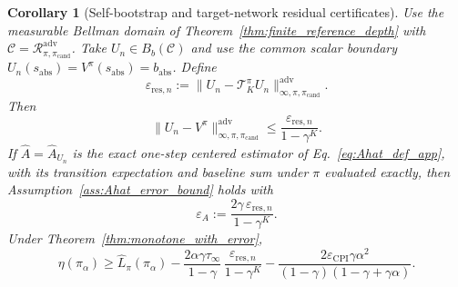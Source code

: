 \documentclass{article}
\theoremstyle{plain}
\newtheorem{corollary}[theorem]{Corollary}
\theoremstyle{definition}
\theoremstyle{remark}
\begin{document}
\begin{corollary}[Self-bootstrap and target-network residual certificates]
\label{cor:finite_depth_residual_certificate}
Use the measurable Bellman domain of Theorem~\ref{thm:finite_reference_depth}
with $\mathcal C=\mathcal R_{\pi,\pi_{\mathrm{cand}}}^{\mathrm{adv}}$.
Take $U_n\in B_b(\mathcal C)$ and use the common scalar boundary
$U_n(s_{\mathrm{abs}})=V^\pi(s_{\mathrm{abs}})=b_{\mathrm{abs}}$. Define
\begin{equation}
\varepsilon_{\mathrm{res},n}
:=
\|U_n-\mathcal{T}^\pi_K U_n\|_{\infty,\pi,\pi_{\mathrm{cand}}}^{\mathrm{adv}}.
\label{eq:eps_res_n_def}
\end{equation}
Then
\begin{equation}
\|U_n-V^\pi\|_{\infty,\pi,\pi_{\mathrm{cand}}}^{\mathrm{adv}}
\le
\frac{\varepsilon_{\mathrm{res},n}}{1-\gamma^K}.
\label{eq:finite_depth_residual_certificate}
\end{equation}
If $\widehat A=\widehat A_{U_n}$ is the exact one-step centered estimator of
Eq.~\eqref{eq:Ahat_def_app}, with its transition expectation and baseline sum
under $\pi$ evaluated exactly, then Assumption~\ref{ass:Ahat_error_bound}
holds with
\begin{equation}
\varepsilon_A
:=
\frac{2\gamma\,\varepsilon_{\mathrm{res},n}}{1-\gamma^K}.
\label{eq:finite_depth_residual_adv}
\end{equation}
Under Theorem~\ref{thm:monotone_with_error},
\begin{equation}
\eta(\pi_\alpha)
\ge
\widehat{L}_\pi(\pi_\alpha)
-
\frac{2\alpha\gamma\tau_\infty}{1-\gamma}\,
\frac{\varepsilon_{\mathrm{res},n}}{1-\gamma^K}
-
\frac{2\varepsilon_{\mathrm{CPI}}\gamma\alpha^2}
{(1-\gamma)(1-\gamma+\gamma\alpha)}.
\label{eq:finite_depth_residual_cpi}
\end{equation}


\end{corollary}
\end{document}
